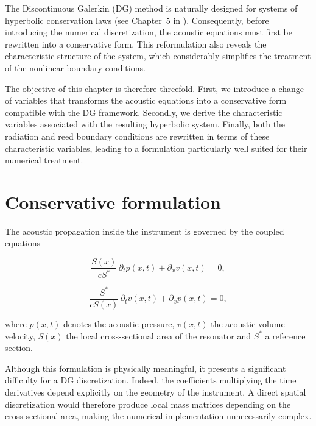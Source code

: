 \documentclass[11pt,a4paper]{report}
\theoremstyle{plain}
\theoremstyle{definition}
\begin{document}
The Discontinuous Galerkin (DG) method is naturally designed for systems of
hyperbolic conservation laws (see Chapter~5 in \cite{HesthavenWarburton2008}). Consequently, before introducing the numerical
discretization, the acoustic equations must first be rewritten into a
conservative form. This reformulation also reveals the characteristic structure
of the system, which considerably simplifies the treatment of the nonlinear
boundary conditions.

The objective of this chapter is therefore threefold. First, we introduce a
change of variables that transforms the acoustic equations into a conservative
form compatible with the DG framework. Secondly, we derive the characteristic
variables associated with the resulting hyperbolic system. Finally, both the
radiation and reed boundary conditions are rewritten in terms of these
characteristic variables, leading to a formulation particularly well suited for
their numerical treatment.


\section{Conservative formulation}

The acoustic propagation inside the instrument is governed by the coupled
equations

\begin{equation}
\frac{S(x)}{cS^\ast}\,\partial_t p(x,t)
+
\partial_x v(x,t)
=
0,
\label{eq:cons_original_1}
\end{equation}

\begin{equation}
\frac{S^\ast}{cS(x)}\,\partial_t v(x,t)
+
\partial_x p(x,t)
=
0,
\label{eq:cons_original_2}
\end{equation}

where \(p(x,t)\) denotes the acoustic pressure, \(v(x,t)\) the acoustic volume
velocity, \(S(x)\) the local cross-sectional area of the resonator and
\(S^\ast\) a reference section.

Although this formulation is physically meaningful, it presents a significant
difficulty for a DG discretization. Indeed, the coefficients multiplying the
time derivatives depend explicitly on the geometry of the instrument. A direct
spatial discretization would therefore produce local mass matrices depending on
the cross-sectional area, making the numerical implementation unnecessarily
complex.
\end{document}
